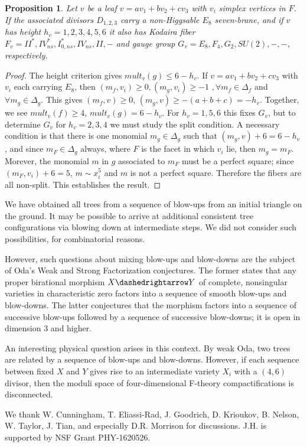 \documentclass[aps,prl,twocolumn, superscriptaddress,groupedaddress,nofootinbib]{revtex4-1}
\newtheorem{prop}{Proposition}
\begin{document}
\begin{prop}
\label{prop:E8roots}
Let $v$ be a leaf $v=av_1 + bv_2 + cv_3$ with $v_i$ simplex vertices in $F$. If the associated divisors $D_{1,2,3}$
carry a non-Higgsable $E_8$ seven-brane, and if $v$ has height
 $h_v=1,2,3,4,5,6$ it also has Kodaira fiber $F_v=II^*,IV^*_{ns},I^*_{0,ns},IV_{ns},II,-$
and gauge group $G_v=E_8,F_4,G_2,SU(2),-,-$, respectively.
\end{prop}
\begin{proof}
The height criterion
gives $mult_v(g)\leq 6-h_v$. If $v=av_1+bv_2+cv_3$ with $v_i$ each carrying $E_8$,
then 
$(m_f,v_i)\geq 0, (m_g,v_i)\geq -1\,\,, \forall m_f\in \Delta_f 
$ and $\forall m_g\in \Delta_g$.
This gives $(m_f,v)\geq 0$, $(m_g,v)\geq-(a+b+c)= -h_v$. Together, we see
$mult_v(f)\geq 4$, $mult_v(g)=6-h_v$. For $h_v= 1,5,6$ this fixes $G_v$, but 
to determine $G_v$ for $h_v=2,3,4$ we must study the split condition. A necessary
condition is that there is one monomial $m_g\in \Delta_g$ such that $(m_g,v)+6=6-h_v$,
and since $m_F \in \Delta_g$ always, where $F$ is the facet in which $v_i$ lie,
then $m_g=m_F$. Morever, the monomial $m$ in $g$ associated to $m_F$ must be a perfect
square; since $(m_F,v_i)+6=5$, $m\sim x_i^5$ and $m$ is not a perfect square. 
Therefore the fibers are all non-split. This establishes the result.
\end{proof}


  We have obtained all trees from a sequence of blow-ups from an
initial triangle on the ground. It may be possible to arrive at additional consistent tree
configurations via  blowing down at intermediate steps. We did not consider
such possibilities, for combinatorial reasons.

However, such questions about mixing blow-ups and blow-downs are the subject
of Oda's Weak and Strong Factorization conjectures. The former states that any proper birational morphism $X \dashedrightarrow Y$ of complete, nonsingular varieties in characteristic zero factors into a sequence of smooth blow-ups and blow-downs. The latter conjectures
that the morphism factors into a sequence of successive blow-ups followed by a sequence of
successive blow-downs; it is open in dimension 3 and higher.

An interesting physical question arises in this context. By weak Oda, two trees are
related by a sequence of blow-ups and blow-downs. However, if each sequence between
fixed $X$ and $Y$ gives rise to an intermediate variety $X_i$ with a $(4,6)$ divisor,
then the moduli space of four-dimensional F-theory compactifications is disconnected.

\vspace{.2cm}
 We thank W. Cunningham, T. Eliassi-Rad, J. Goodrich,  D. Krioukov, B. Nelson, W. Taylor, J. Tian,
and especially D.R. Morrison for discussions. 
J.H. is supported by
NSF Grant PHY-1620526.




\end{document}
